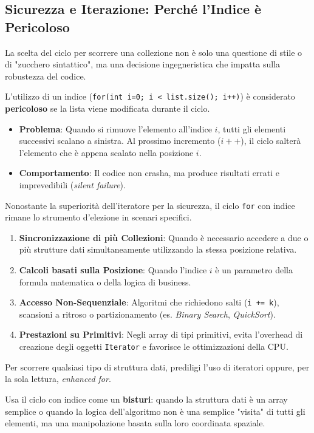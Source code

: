 \subsection{Sicurezza e Iterazione: Perché l'Indice è Pericoloso}

La scelta del ciclo per scorrere una collezione non è solo una questione di stile o di "zucchero sintattico", ma una decisione ingegneristica che impatta sulla robustezza del codice.

L'utilizzo di un indice (\texttt{for(int i=0; i < list.size(); i++)}) è considerato \textbf{pericoloso} se la lista viene modificata durante il ciclo.

\begin{itemize}
    \item \textbf{Problema}: Quando si rimuove l'elemento all'indice $i$, tutti gli elementi successivi scalano a sinistra. Al prossimo incremento ($i++$), il ciclo salterà l'elemento che è appena scalato nella posizione $i$.
    \item \textbf{Comportamento}: Il codice non crasha, ma produce risultati errati e imprevedibili (\textit{silent failure}).
\end{itemize}

\medskip

Nonostante la superiorità dell'iteratore per la sicurezza, il ciclo \texttt{for} con indice rimane lo strumento d'elezione in scenari specifici.

\begin{enumerate}
    \item \textbf{Sincronizzazione di più Collezioni}: Quando è necessario accedere a due o più strutture dati simultaneamente utilizzando la stessa posizione relativa.
    \item \textbf{Calcoli basati sulla Posizione}: Quando l'indice $i$ è un parametro della formula matematica o della logica di business.
    \item \textbf{Accesso Non-Sequenziale}: Algoritmi che richiedono salti (\texttt{i += k}), scansioni a ritroso o partizionamento (es. \textit{Binary Search}, \textit{QuickSort}).
    \item \textbf{Prestazioni su Primitivi}: Negli array di tipi primitivi, evita l'overhead di creazione degli oggetti \texttt{Iterator} e favorisce le ottimizzazioni della CPU.
\end{enumerate}

\begin{tip}
    Per scorrere qualsiasi tipo di struttura dati, prediligi l'uso di iteratori oppure, per la sola lettura, \textit{enhanced for}.

    Usa il ciclo con indice come un \textbf{bisturi}: quando la struttura dati è un array semplice o quando la logica dell'algoritmo non è una semplice "visita" di tutti gli elementi, ma una manipolazione basata sulla loro coordinata spaziale.
\end{tip}

